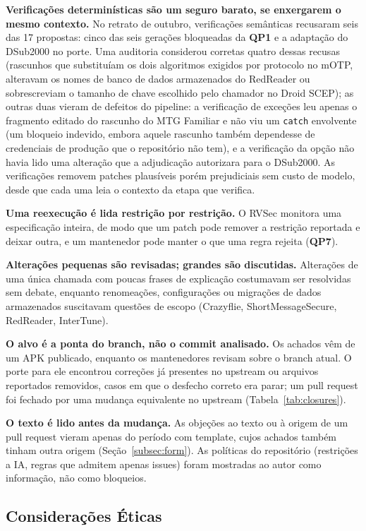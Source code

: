 \documentclass[conference]{IEEEtran}
\newcommand{\researchq}[1]{\textbf{QP#1}}
\begin{document}
\textbf{Verificações determinísticas são um seguro barato, se enxergarem o mesmo contexto.}
No retrato de outubro, verificações semânticas recusaram seis das 17 propostas: cinco
das seis gerações bloqueadas da \researchq{1} e a adaptação do DSub2000 no porte. Uma
auditoria considerou corretas quatro dessas recusas (rascunhos que substituíam os dois
algoritmos exigidos por protocolo no mOTP, alteravam os nomes de banco de dados
armazenados do RedReader ou sobrescreviam o tamanho de chave escolhido pelo chamador no
Droid SCEP); as outras duas vieram de defeitos do pipeline: a verificação de exceções leu
apenas o fragmento editado do rascunho do MTG Familiar e não viu um \texttt{catch}
envolvente (um bloqueio indevido, embora aquele rascunho também dependesse
de credenciais de produção que o repositório não tem), e a verificação da opção não havia lido uma alteração que a
adjudicação autorizara para o DSub2000.
As verificações removem patches plausíveis porém prejudiciais sem custo de modelo, desde que cada uma
leia o contexto da etapa que verifica.

\textbf{Uma reexecução é lida restrição por restrição.} O RVSec monitora uma
especificação inteira, de modo que um patch pode remover a restrição reportada e
deixar outra, e um mantenedor pode manter o que uma regra rejeita (\researchq{7}).

\textbf{Alterações pequenas são revisadas; grandes são discutidas.} Alterações de uma
única chamada com poucas frases de explicação costumavam ser resolvidas sem
debate, enquanto renomeações, configurações ou migrações de dados armazenados suscitavam questões de
escopo (Crazyflie, ShortMessageSecure, RedReader, InterTune).

\textbf{O alvo é a ponta do branch, não o commit analisado.} Os achados vêm de
um APK publicado, enquanto os mantenedores revisam sobre o branch atual. O porte
para ele encontrou correções já presentes no upstream ou arquivos reportados
removidos, casos em que o desfecho correto era parar; um pull request foi fechado
por uma mudança equivalente no upstream (Tabela~\ref{tab:closures}).

\textbf{O texto é lido antes da mudança.} As objeções ao texto ou à origem de um
pull request vieram apenas do período com template, cujos achados também tinham outra
origem (Seção~\ref{subsec:form}). As políticas do repositório (restrições a IA, regras
que admitem apenas issues) foram mostradas ao autor como informação, não como
bloqueios.

\subsection{Considerações Éticas}
\label{subsec:ethics}
\end{document}
